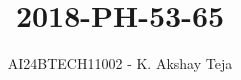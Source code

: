 \documentclass[journal,9pt,onecolumn]{IEEEtran}
\begin{document}

\vspace{3cm}
\title{2018-PH-53-65}
\author{AI24BTECH11002 - K. Akshay Teja}
\maketitle
 \bigskip
{\let\newpage\relax\maketitle}

\renewcommand{\thefigure}{\theenumi}
\renewcommand{\thetable}{\theenumi}
\setlength{\intextsep}{10pt} %

\renewcommand{\thetable}{\theenumi}
\end{document}
